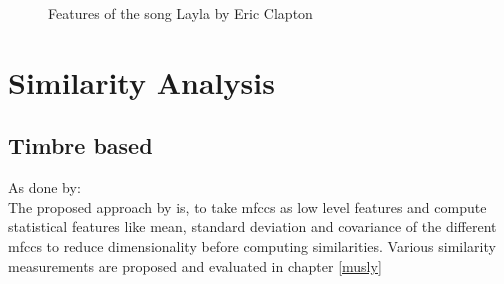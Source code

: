 \FloatBarrier
\begin{figure}[htbp]
	\centering
	\caption{Features of the song Layla by Eric Clapton}
	\label{fig:feat2}
\end{figure}
\FloatBarrier
\section{Similarity Analysis}

\subsection{Timbre based}

As done by: \cite{schnitzer1}\\
The proposed approach by \cite{schnitzer1} is, to take mfccs as low level features and compute statistical features like mean, standard deviation and covariance of the different mfccs to reduce dimensionality before computing similarities.
Various similarity measurements are proposed and evaluated in chapter \ref{musly}

